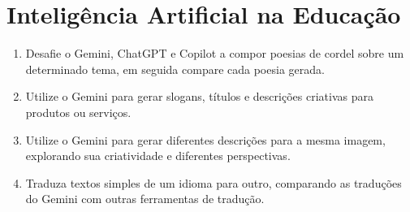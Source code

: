 \documentclass[11pt]{article}
\begin{document}
\section{Inteligência Artificial na Educação}

\begin{enumerate}
		\item Desafie o Gemini, ChatGPT e Copilot a compor poesias de cordel sobre um determinado tema, em seguida compare cada poesia gerada.
		\item Utilize o Gemini para gerar slogans, títulos e descrições criativas para produtos ou serviços.
		\item Utilize o Gemini para gerar diferentes descrições para a mesma imagem, explorando sua criatividade e diferentes perspectivas.
		\item Traduza textos simples de um idioma para outro, comparando as traduções do Gemini com outras ferramentas de tradução.
\end{enumerate}
\end{document}
